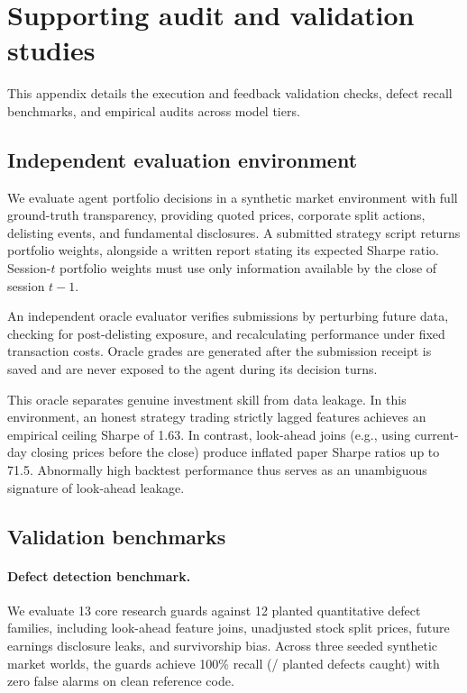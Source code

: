\section{Supporting audit and validation studies}
\label{app:audit}
This appendix details the execution and feedback validation checks, defect recall
benchmarks, and empirical audits across model tiers.

\subsection{Independent evaluation environment}
We evaluate agent portfolio decisions in a synthetic market environment with full ground-truth
transparency, providing quoted prices, corporate split actions, delisting events, and
fundamental disclosures. A submitted strategy script returns portfolio weights, alongside
a written report stating its expected Sharpe ratio. Session-$t$ portfolio weights must use
only information available by the close of session $t-1$.

An independent oracle evaluator verifies submissions by perturbing future data, checking
for post-delisting exposure, and recalculating performance under fixed transaction costs.
Oracle grades are generated after the submission receipt is saved and are never exposed
to the agent during its decision turns.

This oracle separates genuine investment skill from data leakage. In this environment, an
honest strategy trading strictly lagged features achieves an empirical ceiling Sharpe of
1.63. In contrast, look-ahead joins (e.g., using current-day closing prices before the
close) produce inflated paper Sharpe ratios up to 71.5. Abnormally high backtest performance
thus serves as an unambiguous signature of look-ahead leakage.

\subsection{Validation benchmarks}
\paragraph{Defect detection benchmark.}
We evaluate 13 core research guards against 12 planted quantitative defect families,
including look-ahead feature joins, unadjusted stock split prices, future earnings
disclosure leaks, and survivorship bias. Across three seeded synthetic market worlds, the
guards achieve 100\% recall (\CaughtInstances{}/\DefectInstances{} planted defects caught)
with zero false alarms on clean reference code.

